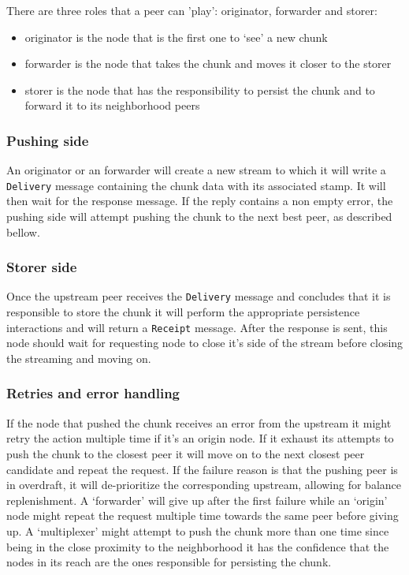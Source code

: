 There are three roles that a peer can 'play': originator, forwarder and storer:
\begin{itemize}
\tightlist
\item originator is the node that is the first one to `see' a new chunk
\item forwarder is the node that takes the chunk and moves it closer to the storer
\item storer is the node that has the responsibility to persist the chunk and to forward it to its neighborhood peers
\end{itemize}

\subsubsection{Pushing side}\label{pushing-side}

An originator or an forwarder will create a new stream to which it will
write a \texttt{Delivery} message containing the chunk data with its
associated stamp. It will then wait for the response message. If the
reply contains a non empty error, the pushing side will attempt pushing
the chunk to the next best peer, as described bellow.

\subsubsection{Storer side}\label{storer-side}

Once the upstream peer receives the \texttt{Delivery} message and
concludes that it is responsible to store the chunk it will perform the
appropriate persistence interactions and will return a \texttt{Receipt}
message. After the response is sent, this node should wait for
requesting node to close it's side of the stream before closing the
streaming and moving on.

\subsubsection{Retries and error handling}\label{retries-and-error-handling}

If the node that pushed the chunk receives an error from the upstream it
might retry the action multiple time if it's an origin node. If it
exhaust its attempts to push the chunk to the closest peer it will move
on to the next closest peer candidate and repeat the request. If the
failure reason is that the pushing peer is in overdraft, it will
de-prioritize the corresponding upstream, allowing for balance
replenishment. A `forwarder' will give up after the first failure while
an `origin' node might repeat the request multiple time towards the same
peer before giving up. A `multiplexer' might attempt to push the chunk
more than one time since being in the close proximity to the
neighborhood it has the confidence that the nodes in its reach are the
ones responsible for persisting the chunk.

